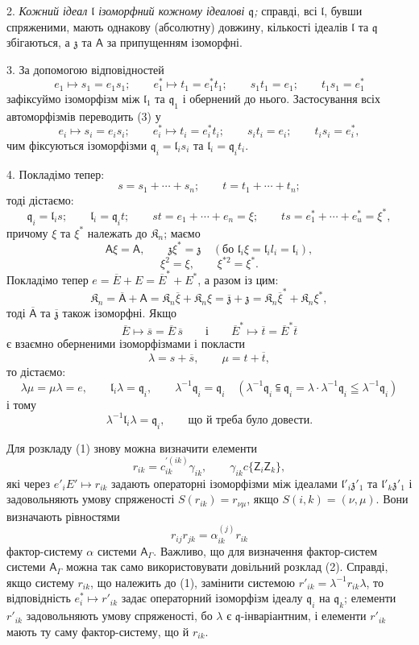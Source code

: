 \documentclass[11pt]{article}
\begin{document}
2. \emph{Кожний ідеал \(\mathfrak l\) ізоморфний кожному ідеалові \(\mathfrak q\);} справді, всі \(\mathfrak l\), бувши спряженими, мають однакову (абсолютну) довжину, кількості ідеалів \(\mathfrak l\) та \(\mathfrak q\) збігаються, а \(\mathfrak z\) та \(\mathsf{A}\) за припущенням ізоморфні.

3. За допомогою відповідностей
\[
\tag{3}
e_1\mapsto s_1=e_1s_1;\qquad
e_1^*\mapsto t_1=e_1^*t_1;\qquad
s_1t_1=e_1;\qquad
t_1s_1=e_1^*
\]
зафіксуймо ізоморфізм між \(\mathfrak l_1\) та \(\mathfrak q_1\) і обернений до нього. Застосування всіх автоморфізмів переводить (3) у
\[
e_i\mapsto s_i=e_is_i;\qquad
e_i^*\mapsto t_i=e_i^*t_i;\qquad
s_it_i=e_i;\qquad
t_is_i=e_i^*,
\]
чим фіксуються ізоморфізми \(\mathfrak q_i=\mathfrak l_is_i\) та \(\mathfrak l_i=\mathfrak q_it_i\).

4. Покладімо тепер:
\[
s=s_1+\cdots+s_n;\qquad t=t_1+\cdots+t_n;
\]
тоді дістаємо:
\[
\mathfrak q_i=\mathfrak l_is;\qquad
\mathfrak l_i=\mathfrak q_it;\qquad
st=e_1+\cdots+e_n=\xi;\qquad
ts=e_1^*+\cdots+e_u^*=\xi^*,
\]
причому \(\xi\) та \(\xi^*\) належать до \(\mathfrak K_n\); маємо
\[
\mathsf{A}\xi=\mathsf{A},\qquad \mathfrak z\xi^*=\mathfrak z\quad
(\text{бо }\mathfrak l_i\xi=\mathfrak l_il_i=\mathfrak l_i),
\]
\[
\xi^2=\xi,\qquad \xi^{*2}=\xi^*.
\]
Покладімо тепер \(e=\overline E+E=\overline E^*+E^*\), а разом із цим:
\[
\mathfrak K_n=\overline{\mathsf A}+\mathsf{A}
=\mathfrak K_n\overline\xi+\mathfrak K_n\xi
=\overline{\mathfrak z}+\mathfrak z
=\mathfrak K_n\overline\xi^*+\mathfrak K_n\xi^*,
\]
тоді \(\overline{\mathsf A}\) та \(\overline{\mathfrak z}\) також ізоморфні. Якщо
\[
\overline E\mapsto\overline s=\overline E\,\overline s
\qquad\text{і}\qquad
\overline E^*\mapsto\overline t=\overline E^*\overline t
\]
є взаємно оберненими ізоморфізмами і покласти
\[
\lambda=s+\overline s,\qquad \mu=t+\overline t,
\]
то дістаємо:
\[
\lambda\mu=\mu\lambda=e,\qquad
\mathfrak l_i\lambda=\mathfrak q_i,\qquad
\lambda^{-1}\mathfrak q_i=\mathfrak q_i
\quad
(\lambda^{-1}\mathfrak q_i\subseteqq\mathfrak q_i
=\lambda\cdot\lambda^{-1}\mathfrak q_i\leqq\lambda^{-1}\mathfrak q_i)
\]
і тому
\[
\lambda^{-1}\mathfrak l_i\lambda=\mathfrak q_i,\qquad \text{що й треба було довести.}
\]

Для розкладу (1) знову можна визначити елементи
\[
r_{ik}=c_{ik}^{\prime(ik)}\gamma_{ik},\qquad \gamma_{ik}c\{\mathsf{Z}_i\mathsf{Z}_k\},
\]
які через \(e'_iE'\mapsto r_{ik}\) задають операторні ізоморфізми між ідеалами \(\mathfrak l'_i\mathfrak z'_1\) та \(\mathfrak l'_k\mathfrak z'_1\) і задовольняють умову спряженості \(S(r_{ik})=r_{\nu\mu}\), якщо \(S(i,k)=(\nu,\mu)\). Вони визначають рівностями
\[
r_{ij}r_{jk}=\alpha_{ik}^{(j)}r_{ik}
\]
фактор-систему \(\alpha\) системи \(\mathsf{A}_\Gamma\). Важливо, що для визначення фактор-систем системи \(\mathsf{A}_\Gamma\) можна так само використовувати довільний розклад (2). Справді, якщо систему \(r_{ik}\), що належить до (1), замінити системою \(r'_{ik}=\lambda^{-1}r_{ik}\lambda\), то відповідність \(e_i^*\mapsto r'_{ik}\) задає операторний ізоморфізм ідеалу \(\mathfrak q_i\) на \(\mathfrak q_k\); елементи \(r'_{ik}\) задовольняють умову спряженості, бо \(\lambda\) є \(\mathfrak q\)-інваріантним, і елементи \(r'_{ik}\) мають ту саму фактор-систему, що й \(r_{ik}\).
\end{document}
